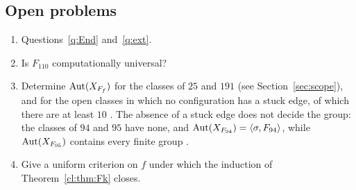 \subsection{Open problems}\label{sec:open}
\begin{enumerate}
\item Questions~\ref{q:End} and~\ref{q:ext}.
\item Is $F_{110}$ computationally universal?
\item Determine $\operatorname{Aut}(X_{F_f})$ for the classes of $25$ and $191$ (see Section~\ref{sec:scope}), and for the open classes in which no configuration has a stuck edge, of which there are at least $10$ \cite{PaperD}. The absence of a stuck edge does not decide the group: the classes of $94$ and $95$ have none, and $\operatorname{Aut}(X_{F_{94}})=\langle\sigma,F_{94}\rangle$, while $\operatorname{Aut}(X_{F_{95}})$ contains every finite group \cite{PaperE}.
\item Give a uniform criterion on $f$ under which the induction of Theorem~\ref{cl:thm:Fk} closes.
\end{enumerate}
